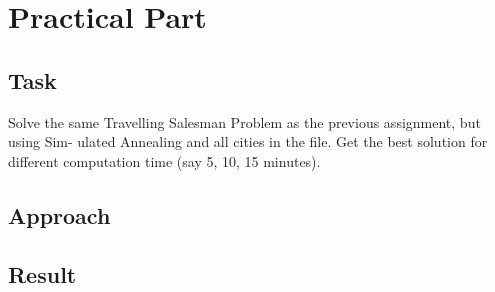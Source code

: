 \documentclass[paper=a4, fontsize=11pt]{scrartcl} %
\numberwithin{equation}{section} %
\numberwithin{figure}{section} %
\numberwithin{table}{section} %
\begin{document}
\section{Practical Part}

\subsection{Task}
Solve the same Travelling Salesman Problem as the previous assignment, but using Sim-
ulated Annealing and all cities in the file. Get the best solution for different computation
time (say 5, 10, 15 minutes).

\subsection{Approach}

\subsection{Result}
\end{document}
